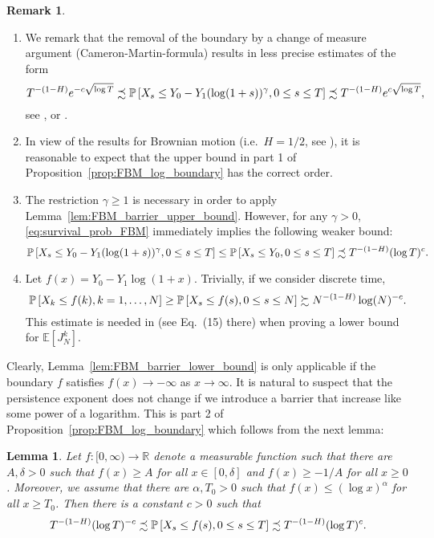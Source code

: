 \documentclass[11pt]{article}
\theoremstyle{plain}
\newtheorem{lem}[thm]{Lemma}
\theoremstyle{definition}
\newtheorem{remark}[thm]{Remark}
\begin{document}
\begin{remark}
\begin{enumerate}
   \item We remark that the removal of the boundary by a change of measure argument (Cameron-Martin-formula) results in less precise estimates of the form 
\[
   T^{-(1-H)} e^{-c\sqrt{\log T}} \precsim {{{\bf {\mathbb{P}}}}\left[{X_s\leq Y_0 - Y_1 (\log (1 + s))^\gamma, 0\leq  s\leq T}\right]} \precsim  T^{-(1-H)} e^{c\sqrt{\log T}},
\]
see \cite{aurzada-dereich:2011}, \cite{molchan:1999a} or \cite{molchan:2012}.
\item In view of the results for Brownian motion (i.e.\ $H=1/2$, see \cite{uchiyama:1980}), it is reasonable to expect that the upper bound in part 1 of Proposition~\ref{prop:FBM_log_boundary} has the correct order. 
\item The restriction $\gamma \ge 1$ is necessary in order to apply Lemma~\ref{lem:FBM_barrier_upper_bound}. However, for any $\gamma > 0$, \eqref{eq:survival_prob_FBM} immediately implies the following weaker bound:
\[
   {{{\bf {\mathbb{P}}}}\left[{X_s \le Y_0 - Y_1 (\log(1+s))^\gamma, 0 \le s \le T}\right]} \le {{{\bf {\mathbb{P}}}}\left[{X_s \le Y_0, 0 \le s \le T}\right]} \precsim T^{-(1-H)} (\log T)^c. 
\]
\item Let $f(x) = Y_0 - Y_1 \log(1+x)$. Trivially, if we consider discrete time, 
\[
   {{{\bf {\mathbb{P}}}}\left[{X_k \le f(k), k=1,\dots,N}\right]} \ge {{{\bf {\mathbb{P}}}}\left[{X_s \le f(s), 0 \le s \le N}\right]} \succsim N^{-(1-H)} \log(N)^{-c}.
\]
This estimate is needed in \cite{o-r-s:2012} (see Eq.\ (15) there) when proving a lower bound for ${\mathbb{E}\left[{J_N^k}\right]}$. 
\end{enumerate}
\end{remark}
Clearly, Lemma~\ref{lem:FBM_barrier_lower_bound} is only applicable if the boundary $f$ satisfies $f(x) \to -\infty$ as $x \to \infty$. It is natural to suspect that the persistence exponent does not change if we introduce a barrier that increase like some power of a logarithm.  This is part 2 of Proposition~\ref{prop:FBM_log_boundary} which follows from the next lemma:
\begin{lem}
   Let $f \colon [0,\infty) \to \mathbb{R}$ denote a measurable function such that there are $A,\delta > 0$ such that $f(x) \ge A$ for all $x \in [0,\delta]$ and $f(x) \ge -1/A$ for all $x \ge 0$. Moreover, we assume that there are $\alpha, T_0 > 0$ such that $f(x) \le (\log x)^{\alpha}$ for all $x \ge T_0$.
Then there is a constant $c > 0$ such that
\[
   T^{-(1-H)} (\log T)^{-c} \precsim {{{\bf {\mathbb{P}}}}\left[{X_s \leq f(s), 0 \le  s \le T}\right]} \precsim T^{-(1-H)} (\log T)^c.
\]
\end{lem}
\end{document}
